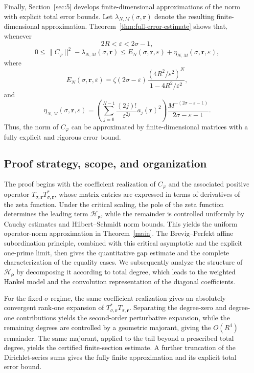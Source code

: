 \documentclass[12pt, reqno]{amsart}
\numberwithin{equation}{section}
\begin{document}
Finally, Section~\ref{sec:5} develops finite-dimensional approximations
of the norm with explicit total error bounds.  Let
$\lambda_{N,M}(\sigma,\boldsymbol r)$ denote the resulting
finite-dimensional approximation. Theorem~\ref{thm:full-error-estimate}
shows that, whenever
\[
2R<\varepsilon<2\sigma-1,
\]
\[
0
\leq
\|C_{\varphi}\|^2
-
\lambda_{N,M}(\sigma,\boldsymbol r)
\leq
E_N(\sigma,\boldsymbol r,\varepsilon)
+
\eta_{N,M}(\sigma,\boldsymbol r,\varepsilon),
\]
where
\[
E_N(\sigma,\boldsymbol r,\varepsilon)
=
\zeta(2\sigma-\varepsilon)
\frac{(4R^2/\varepsilon^2)^N}
{1-4R^2/\varepsilon^2},
\]
and
\[
\eta_{N,M}(\sigma,\boldsymbol r,\varepsilon)
=
\left(
\sum_{j=0}^{N-1}
\frac{(2j)!}{\varepsilon^{2j}}
a_j(\boldsymbol r)^2
\right)
\frac{M^{-(2\sigma-\varepsilon-1)}}
{2\sigma-\varepsilon-1}.
\]
Thus, the norm of $C_{\varphi}$ can be
approximated by finite-dimensional matrices with a fully explicit
and rigorous error bound.

\subsection{Proof strategy, scope, and organization}


The proof begins with the coefficient realization of $C_\varphi$ and the
associated positive operator
$T_{\sigma,\boldsymbol r}T_{\sigma,\boldsymbol r}^*$, whose matrix
entries are expressed in terms of derivatives of the zeta function.
Under the critical scaling, the pole of the zeta function determines the
leading term $\mathcal H_{\boldsymbol\rho}$, while the remainder is
controlled uniformly by Cauchy estimates and Hilbert--Schmidt norm
bounds. This yields the uniform operator-norm approximation in
Theorem~\ref{main}. The Brevig--Perfekt affine subordination principle,
combined with this critical asymptotic and the explicit one-prime
limit, then gives the quantitative gap estimate and the complete
characterization of the equality cases. We subsequently analyze the
structure of $\mathcal H_{\boldsymbol\rho}$ by decomposing it according
to total degree, which leads to the weighted Hankel model and the
convolution representation of the diagonal coefficients.

For the fixed-$\sigma$ regime, the same coefficient realization gives an
absolutely convergent rank-one expansion of
$T_{\sigma,\boldsymbol r}^*T_{\sigma,\boldsymbol r}$. Separating the
degree-zero and degree-one contributions yields the second-order
perturbative expansion, while the remaining degrees are controlled by a
geometric majorant, giving the $O(R^4)$ remainder. The same majorant,
applied to the tail beyond a prescribed total degree, yields the
certified finite-section estimate. A further truncation of the
Dirichlet-series sums gives the fully finite approximation and its
explicit total error bound.
\end{document}
